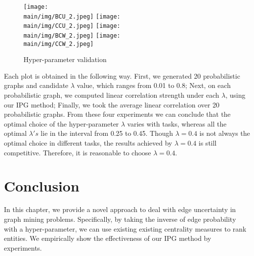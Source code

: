 \documentclass[\main/thesis.tex]{subfiles}
\begin{document}
\begin{figure}
\texttt{[image: \\main/img/BCU\_2.jpeg]}
\texttt{[image: \\main/img/CCU\_2.jpeg]}
\texttt{[image: \\main/img/BCW\_2.jpeg]}
\texttt{[image: \\main/img/CCW\_2.jpeg]}
\caption{Hyper-parameter validation}
\label{hyper}
\end{figure}

Each plot is obtained in the following way. First, we generated 20 probabilistic graphs and candidate $\lambda$ value, which ranges from 0.01 to 0.8; Next, on each probabilistic graph, we computed linear correlation strength under each $\lambda$, using our IPG method; Finally, we took the average linear correlation over 20 probabilistic graphs. From these four experiments we can conclude that the optimal choice of the hyper-parameter $\lambda$ varies with tasks, whereas all the optimal $\lambda's$ lie in the interval from 0.25 to 0.45. Though $\lambda=0.4$ is not always the optimal choice in different tasks, the results achieved by $\lambda=0.4$ is still competitive. Therefore, it is reasonable to choose $\lambda=0.4$.

\section{Conclusion}
In this chapter, we provide a novel approach to deal with edge uncertainty in graph mining problems. Specifically, by taking the inverse of edge probability with a hyper-parameter, we can use existing existing centrality measures to rank entities. We empirically show the effectiveness of our IPG method by experiments. %
\end{document}
